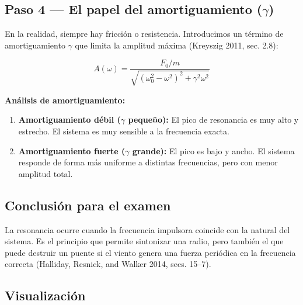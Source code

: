 \documentclass[
  letterpaper,
  DIV=11,
  numbers=noendperiod]{scrreprt}
\providecommand{\tightlist}{%
  \setlength{\itemsep}{0pt}\setlength{\parskip}{0pt}}
\begin{document}
\subsection{\texorpdfstring{Paso 4 --- El papel del amortiguamiento
(\(\gamma\))}{Paso 4 --- El papel del amortiguamiento (\textbackslash gamma)}}\label{paso-4-el-papel-del-amortiguamiento-gamma}

En la realidad, siempre hay fricción o resistencia. Introducimos un
término de amortiguamiento \(\gamma\) que limita la amplitud máxima
(Kreyszig 2011, sec. 2.8):

\[
A(\omega) = \frac{F_0/m}{\sqrt{(\omega_0^2 - \omega^2)^2 + \gamma^2\omega^2}}
\]

\textbf{Análisis de amortiguamiento:}

\begin{enumerate}
\def\labelenumi{\arabic{enumi}.}
\tightlist
\item
  \textbf{Amortiguamiento débil (\(\gamma\) pequeño):} El pico de
  resonancia es muy alto y estrecho. El sistema es muy sensible a la
  frecuencia exacta.
\item
  \textbf{Amortiguamiento fuerte (\(\gamma\) grande):} El pico es bajo y
  ancho. El sistema responde de forma más uniforme a distintas
  frecuencias, pero con menor amplitud total.
\end{enumerate}

\subsection{Conclusión para el
examen}\label{conclusiuxf3n-para-el-examen}

La resonancia ocurre cuando la frecuencia impulsora coincide con la
natural del sistema. Es el principio que permite sintonizar una radio,
pero también el que puede destruir un puente si el viento genera una
fuerza periódica en la frecuencia correcta (Halliday, Resnick, and
Walker 2014, secs. 15--7).

\subsection{Visualización}\label{visualizaciuxf3n-3}
\end{document}
